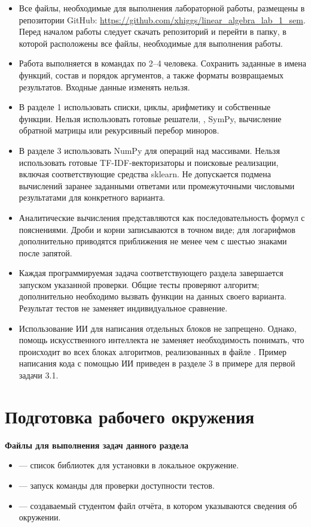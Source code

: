 \documentclass[12pt,a4paper]{article}
\newcommand{\taskhead}[1]{\par\textbf{#1}\par}
\begin{document}
\begin{itemize}

\item Все файлы, необходимые для выполнения лабораторной работы, размещены в репозитории GitHub: \url{https://github.com/xhiggs/linear_algebra_lab_1_sem}. 
Перед началом работы следует скачать репозиторий и перейти в папку, в которой расположены все файлы, необходимые для выполнения работы.
\item Работа выполняется в командах по 2--4 человека. Сохранить заданные в  имена функций,
состав и порядок аргументов, а также форматы возвращаемых результатов. Входные данные изменять нельзя.
\item В разделе 1 использовать списки, циклы, арифметику и собственные функции.
Нельзя использовать готовые решатели, , SymPy, вычисление
обратной матрицы или рекурсивный перебор миноров.
\item В разделе 3 использовать NumPy для операций над массивами.
Нельзя использовать готовые TF-IDF-векторизаторы и поисковые реализации, включая
соответствующие средства sklearn. 
Не допускается подмена вычислений заранее заданными ответами или промежуточными числовыми результатами для конкретного варианта.
\item Аналитические вычисления представляются как последовательность формул с пояснениями.
Дроби и корни записываются в точном виде; для логарифмов дополнительно приводятся
приближения не менее чем с шестью знаками после запятой.
\item Каждая программируемая задача соответствующего раздела завершается запуском указанной проверки.
Общие тесты проверяют алгоритм; дополнительно необходимо вызвать функции на данных
своего варианта. Результат тестов не заменяет индивидуальное сравнение.
\item {Использование ИИ для написания отдельных блоков не запрещено. 
Однако, помощь искусственного интеллекта не заменяет необходимость понимать, 
что происходит во всех блоках алгоритмов, реализованных в файле .
Пример написания кода с помощью ИИ приведен в разделе 3 в примере для первой задачи 3.1.}
\end{itemize}

\newpage

\setcounter{section}{-1}
\section{Подготовка рабочего окружения}
\taskhead{Файлы для выполнения задач данного раздела}
\begin{itemize}
\item {} --- список библиотек для установки в локальное окружение.
\item {} --- запуск команды  для проверки доступности тестов.
\item {} --- создаваемый студентом файл отчёта, в котором указываются сведения об окружении.
\end{itemize}
\end{document}
